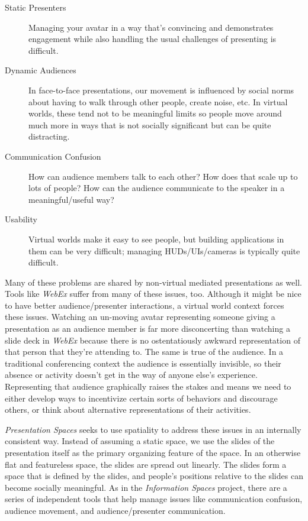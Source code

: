 \begin{description}
\item[Static Presenters]{Managing your avatar in a way that's convincing and demonstrates engagement while also handling the usual challenges of presenting is difficult.}
\item[Dynamic Audiences]{In face-to-face presentations, our movement is influenced by social norms about having to walk through other people, create noise, etc. In virtual worlds, these tend not to be meaningful limits so people move around much more in ways that is not socially significant but can be quite distracting.}
\item[Communication Confusion]{How can audience members talk to each other? How does that scale up to lots of people? How can the audience communicate to the speaker in a meaningful/useful way?}
\item[Usability]{Virtual worlds make it easy to see people, but building applications in them can be very difficult; managing HUDs/UIs/cameras is typically quite difficult.}
\end{description}

Many of these problems are shared by non-virtual mediated presentations as well. Tools like \emph{WebEx} suffer from many of these issues, too. Although it might be nice to have better audience/presenter interactions, a virtual world context forces these issues. Watching an un-moving avatar representing someone giving a presentation as an audience member is far more disconcerting than watching a slide deck in \emph{WebEx} because there is no ostentatiously awkward representation of that person that they're attending to. The same is true of the audience. In a traditional conferencing context the audience is essentially invisible, so their absence or activity doesn't get in the way of anyone else's experience. Representing that audience graphically raises the stakes and means we need to either develop ways to incentivize certain sorts of behaviors and discourage others, or think about alternative representations of their activities. 

\emph{Presentation Spaces} seeks to use spatiality to address these issues in an internally consistent way. Instead of assuming a static space, we use the slides of the presentation itself as the primary organizing feature of the space. In an otherwise flat and featureless space, the slides are spread out linearly. The slides form a space that is defined by the slides, and people's positions relative to the slides can become socially meaningful. As in the \emph{Information Spaces} project, there are a series of independent tools that help manage issues like communication confusion, audience movement, and audience/presenter communication. 

